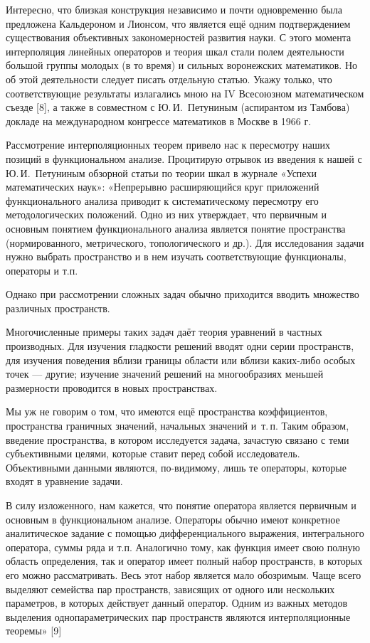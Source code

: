 Интересно, что близкая конструкция независимо и почти одновременно была предложена Кальдероном и Лионсом, что является ещё одним подтверждением существования объективных закономерностей развития науки. С этого момента интерполяция линейных операторов и теория шкал стали полем деятельности большой группы молодых (в то время) и сильных воронежских математиков. Но об этой деятельности следует писать отдельную статью. Укажу только, что соответствующие результаты излагались мною на IV Всесоюзном математическом съезде [8], а также в совместном с Ю.\,И.~Петуниным (аспирантом из Тамбова) докладе на международном конгрессе математиков в Москве в 1966 г.

Рассмотрение интерполяционных теорем привело нас к пересмотру наших позиций в функциональном анализе.
\linebreak
Процитирую отрывок из введения к нашей с Ю.\,И.~Петуниным обзорной статьи по теории шкал в журнале
«Успехи математических наук»:
«Непрерывно расширяющийся круг приложений функционального анализа приводит к систематическому пересмотру его методологических положений. Одно из них утверждает, что первичным и основным понятием функционального анализа является понятие пространства (нормированного, метрического, топологического и др.). Для исследования задачи нужно выбрать пространство и в нем изучать соответствующие функционалы, операторы и т.п.

Однако при рассмотрении сложных задач обычно приходится вводить множество различных пространств.

Многочисленные примеры таких задач даёт теория уравнений в частных производных. Для изучения гладкости решений вводят одни серии пространств, для изучения поведения вблизи границы области или вблизи каких-либо особых точек --- другие; изучение значений решений на многообразиях меньшей размерности проводится в новых пространствах.

Мы уж не говорим о том, что имеются ещё пространства коэффициентов,
пространства граничных значений, начальных значений и~т.\,п.
Таким образом, введение пространства, в котором исследуется задача, зачастую связано с теми су\-бъ\-е\-к\-ти\-в\-ны\-ми целями, которые ставит перед собой исследователь. Объективными данными являются, по-видимому, лишь те операторы, которые входят в уравнение задачи.

В силу изложенного, нам кажется, что понятие оператора является первичным и основным в функциональном анализе. Операторы обычно имеют конкретное аналитическое задание с помощью дифференциального выражения, интегрального оператора, суммы ряда и т.п. Аналогично тому, как функция имеет свою полную область определения, так и оператор имеет полный набор пространств, в которых его можно рассматривать. Весь этот набор является мало обозримым. Чаще всего выделяют семейства пар пространств, зависящих от одного или нескольких параметров, в которых действует данный оператор. Одним из важных методов выделения однопараметрических пар пространств являются интерполяционные теоремы» [9]

